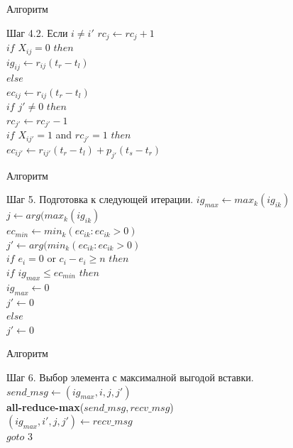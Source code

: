 \documentclass{beamer}
\begin{document}
\begin{frame}[fragile]{Алгоритм}
	\begin{block}{Шаг 4.2. Если $i \ne i'$}
		$rc_j \gets rc_j + 1$\\
		$if$ $X_{ij} = 0$ $then$\\
		\qquad$ig_{ij} \gets r_{ij} (t_r - t_l)$\\
		$else$\\
		\qquad$ec_{ij} \gets r_{ij} (t_r - t_l)$\\
		$if$ $j' \neq 0$ $then$\\
		\qquad$rc_{j'} \gets rc_{j'} - 1$\\
		\qquad$if$ $X_{ij'} = 1$ and $rc_{j'} = 1$ $then$\\
		\qquad\qquad$ec_{ij'} \gets r_{ij'} (t_r - t_l) + p_{j'} (t_s - t_r)$
	\end{block}
\end{frame}

\begin{frame}[fragile]{Алгоритм}
	\begin{block}{Шаг 5. Подготовка к следующей итерации.}
		$ig_{max} \gets max_k (ig_{ik})$\\
		$j \gets arg(max_k(ig_{ik})$\\
		$ec_{min} \gets min_k (ec_{ik} : ec_{ik} > 0)$\\
		$j' \gets arg(min_k(ec_{ik} : ec_{ik} > 0)$\\
		$if$ $e_i = 0$ or $c_i - e_i \ge n$ $then$\\
		\qquad$if$ $ig_{max} \le ec_{min}$ $then$\\
		\qquad\qquad$ig_{max} \gets 0$\\
		\qquad\qquad$j' \gets 0$\\
		$else$\\ 
		\qquad$j' \gets 0$\\
	\end{block}
\end{frame}

\begin{frame}[fragile]{Алгоритм}	
	\begin{block}{Шаг 6. Выбор элемента с максималной выгодой вставки.}
		$send\_msg \gets (ig_{max}, i, j, j')$\\
		\textbf{all-reduce-max}($send\_msg, recv\_msg$)\\
		$(ig_{max}, i', j, j') \gets recv\_msg$\\
		$goto$ $3$
	\end{block}
\end{frame}
\end{document}
